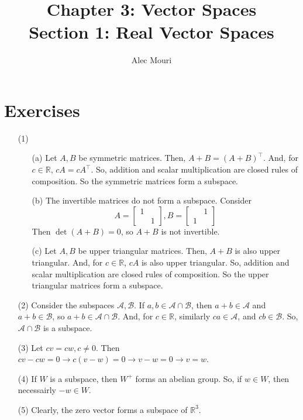 \documentclass[12pt]{article}
\begin{document}
\title{Chapter 3: Vector Spaces \\ Section 1: Real Vector Spaces}
\author{Alec Mouri}

\maketitle
\section*{Exercises}
\begin{itemize}
\item[(1)]
\begin{itemize}
\item[(a)]
Let $A, B$ be symmetric matrices. Then, $A + B = (A + B)^\top$. And, for $c \in \mathbb{R}$, $cA = cA^\top$. So, addition and scalar multiplication are closed rules of composition. So the symmetric matrices form a subspace.
\item[(b)]
The invertible matrices do not form a subspace. Consider
$$A = \begin{bmatrix}
1 \\
& 1
\end{bmatrix}, B = \begin{bmatrix}
& 1 \\
1
\end{bmatrix}$$
Then $\det(A + B) = 0$, so $A + B$ is not invertible.
\item[(c)]
Let $A, B$ be upper triangular matrices. Then, $A + B$ is also upper triangular. And, for $c \in \mathbb{R}$, $cA$ is also upper triangular. So, addition and scalar multiplication are closed rules of composition. So the upper triangular matrices form a subspace.
\end{itemize}
\item[(2)]
Consider the subspaces $\mathcal{A}, \mathcal{B}$. If $a, b \in \mathcal{A} \cap \mathcal{B}$, then $a + b \in \mathcal{A}$ and $a + b \in \mathcal{B}$, so $a + b \in \mathcal{A} \cap \mathcal{B}$. And, for $c \in \mathbb{R}$, similarly $ca \in \mathcal{A}$, and $cb \in \mathcal{B}$. So, $\mathcal{A} \cap \mathcal{B}$ is a subspace.
\item[(3)]
Let $cv = cw, c \neq 0$. Then $cv - cw = 0 \rightarrow c(v - w) = 0 \rightarrow v - w = 0 \rightarrow v = w$.
\item[(4)]
If $W$ is a subspace, then $W^+$ forms an abelian group. So, if $w \in W$, then necessairly $-w \in W$.
\item[(5)]
Clearly, the zero vector forms a subspace of $\mathbb{R}^3$.


\end{itemize}
\end{document}
